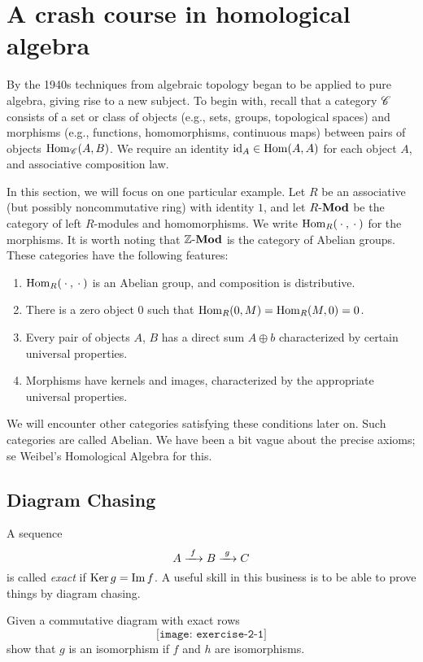 \section{A crash course in homological algebra}
By the 1940s techniques from algebraic topology began to be applied to pure
algebra, giving rise to a new subject. To begin with, recall that a
category \(\mathscr{C}\) consists of a set or class of objects (e.g., sets,
groups, topological spaces) and morphisms (e.g., functions, homomorphisms,
continuous maps) between pairs of objects \(\operatorname{Hom}_{\mathscr{C}}(A,B)\). We require
an identity \(\operatorname{id}_A\in\operatorname{Hom}(A,A)\) for each object \(A\), and associative
composition law.

In this section, we will focus on one particular example. Let \(R\) be an
associative (but possibly noncommutative ring) with identity \(1\), and let
\(R\textnormal{{}-{}}\mathbf{Mod}\) be the category of left \(R\)-modules and homomorphisms. We
write \(\operatorname{Hom}_R({}\cdot{},{}\cdot{})\) for the morphisms. It is worth noting that
\(\mathbb{Z}\textnormal{{}-{}}\mathbf{Mod}\) is the category of Abelian groups. These categories have the
following features:
\begin{enumerate}
\item \(\operatorname{Hom}_R({}\cdot{},{}\cdot{})\) is an Abelian group, and composition is
  distributive.
\item There is a zero object \(0\) such that \(\operatorname{Hom}_R(0,M)=\operatorname{Hom}_R(M,0)=0\).
\item Every pair of objects \(A\), \(B\) has a direct sum \(A\oplus b\)
  characterized by certain universal properties.
\item Morphisms have kernels and images, characterized by the appropriate
  universal properties.
\end{enumerate}

We will encounter other categories satisfying these conditions later
on. Such categories are called Abelian. We have been a bit vague about the
precise axioms; se Weibel's Homological Algebra for this.

\subsection{Diagram Chasing}
A sequence
\[
  A\xrightarrow{\,\,f\,\,}B\xrightarrow{\,\,g\,\,}C
\]
is called \emph{exact} if \(\operatorname{Ker} g=\operatorname{Im} f\). A useful skill in this
business is to be able to prove things by diagram chasing.

\begin{exercise}
  Given a commutative diagram with exact rows
  \[
    \texttt{[image: exercise-2-1]}
  \]
  show that \(g\) is an isomorphism if \(f\) and \(h\) are isomorphisms.
\end{exercise}
\begin{solution*}

\end{solution*}

